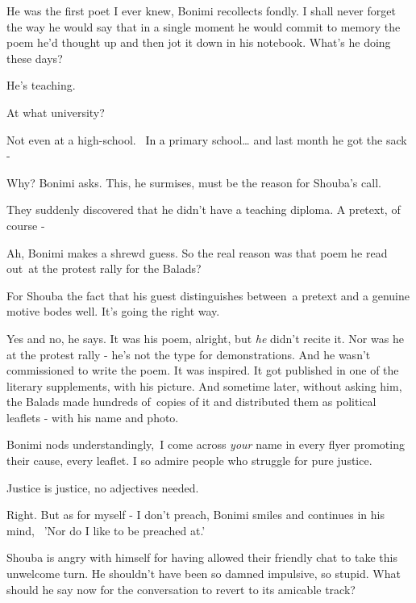 \documentclass[letterpaper]{article}
\begin{document}
{\textquotedbl}He was the first poet I ever knew,{\textquotedbl} Bonimi recollects fondly. {\textquotedbl}I shall never
forget the way he would say that in a single moment he would commit to memory the poem he'd thought up and then jot it
down in his notebook. What's he doing these days?{\textquotedbl}

{\textquotedbl}He's teaching.{\textquotedbl} 

{\textquotedbl}At what university?{\textquotedbl}

{\textquotedbl}Not even \textcolor{black}{at} a high-school.\textcolor{red}{ \ }\textcolor{black}{In a} primary
school{\dots} and last month he got the sack -{\textquotedbl} 

{\textquotedbl}Why?{\textquotedbl} Bonimi asks. This, he surmises, must be the reason for Shouba's call. 

{\textquotedbl}They suddenly discovered that he didn't have a teaching diploma. A pretext, of course -{\textquotedbl}

{\textquotedbl}Ah,{\textquotedbl} Bonimi makes a shrewd guess. {\textquotedbl}So the real reason was that poem he read
out~at the protest rally for the Balads?{\textquotedbl}

For Shouba the fact that his guest distinguishes between~a pretext and a genuine motive bodes well. It's going the right
way. 

{\textquotedbl}Yes and no,{\textquotedbl} he says. {\textquotedbl}It was his poem, alright, but \textit{he} didn't
recite it. Nor was he at the protest rally - he's not the type for demonstrations. And he wasn't commissioned to write
the poem. It was inspired. It got published in one of the literary supplements, with his picture. And sometime later,
without asking him, the Balads made hundreds of~copies of it and distributed them as political leaflets - with his name
and photo.{\textquotedbl} 

Bonimi nods understandingly,~{\textquotedbl}I come across \textit{your }name in every flyer promoting their cause, every
leaflet. I so admire people who struggle for pure justice.{\textquotedbl}

{\textquotedbl}Justice is justice, no adjectives needed.{\textquotedbl}

{\textquotedbl}Right. But as for myself - I don't preach,{\textquotedbl} Bonimi smiles and continues in his mind,
\ {}'Nor do I like to be preached at.'

Shouba is angry with himself for having allowed their friendly chat to take this unwelcome turn. He shouldn't have been
so damned impulsive, so stupid. What should he say now for the conversation to revert to its amicable track?
\end{document}
